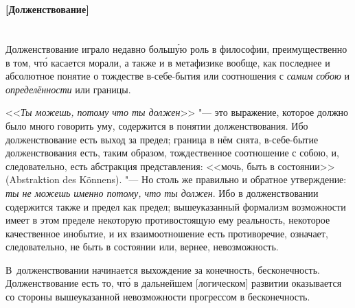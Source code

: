 \paragraph[Примечание. Долженствование]%
{\nopagebreak\\\vspace{1mm}
\footnotesize [Долженствование]\\\vspace{2mm}\\}

Долженствование играло недавно больш\'{у}ю роль в философии, преимущественно в
том, чт\'{о} касается морали, а также и в метафизике вообще, как последнее и
абсолютное понятие о тождестве в-себе-бытия или соотношения с
{\em самим собою} и {\em определённости} или границы.

<<{\em Ты можешь, потому что ты должен}>> "--- это выражение,
которое должно было много говорить уму, содержится в понятии долженствования.
Ибо долженствование есть выход за предел; граница в нём снята, в-себе-бытие
долженствования есть, таким образом, тождественное соотношение с собою, и,
следовательно, есть абстракция представления: <<мочь, быть в состоянии>>
(Abstraktion des Könnens). "--- Но столь же правильно и обратное утверждение:
{\em ты не можешь именно потому, что ты должен}. Ибо в
долженствовании содержится также и предел как предел; вышеуказанный
формализм возможности имеет в этом пределе некоторую противостоящую ему
реальность, некоторое качественное инобытие, и их взаимоотношение есть
противоречие, означает, следовательно, не быть в состоянии или, вернее,
невозможность.

В~долженствовании начинается выхождение за конечность, бесконечность.
Долженствование есть то, чт\'{о} в дальнейшем [логическом] развитии оказывается
со стороны вышеуказанной невозможности прогрессом в бесконечность.

